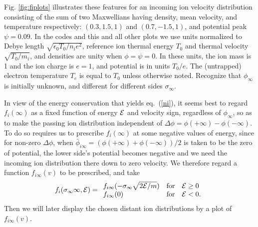 \documentclass[pre]{revtex4-2}
\def\energy{{\cal E}}
\begin{document}
Fig. \ref{fig:fiplots} illustrates these features for an incoming ion
velocity distribution consisting of the sum of two Maxwellians having density,
mean velocity, and temperature respectively: $(0.3,1.5,1)$ and
$(0.7,-1.5,1)$, and potential peak $\psi=0.09$. In the codes and
this and all other plots we use units normalized to Debye length
$\sqrt{\epsilon_0T_0/n_ie^2}$, reference ion thermal energy $T_0$ and
thermal velocity $\sqrt{T_0/m_i}$, and densities are unity when
$\phi=\psi=0$. In these units, the ion mass is 1 and the ion charge is
$e=1$, and potential is in units $T_0/e$. The (untrapped) electron temperature
$T_e$ is equal to $T_0$ unless otherwise noted. Recognize that $\phi_\infty$ is
initially unknown, and different for different sides $\sigma_\infty$.


In view of the energy conservation that yields eq.\ (\ref{ni}), it seems
best to regard $f_{i}(\infty)$ as a fixed function of energy $\energy$
and velocity sign, regardless of $\phi_\infty$, so as to
make the passing ion distribution independent of
$\Delta\phi=\phi(+\infty)-\phi(-\infty)$. To do
so requires us to prescribe $f_i(\infty)$ at some negative values of
energy, since for non-zero $\Delta\phi$, when
$\bar\phi_{i\infty}=(\phi(+\infty)+\phi(-\infty))/2$ is taken to be
the zero of potential, the lower side's potential becomes negative and
we need the incoming ion distribution there down to zero velocity. We
therefore regard a function $f_{i\infty}(v)$ to be prescribed, and take
\begin{equation} 
  \label{eq:fiinf}
  f_i(\sigma_\infty\infty,\energy)=
  \begin{array}{ll}f_{i\infty}(-\sigma_\infty\sqrt{2\energy/m})
  & \mbox{for}\quad \energy\ge 0\\
  f_{i\infty}(0) & \mbox{for}\quad \energy< 0.
  \end{array}
\end{equation}
Then we will later display the chosen distant ion distributions by a plot of
$f_{i\infty}(v)$.
\end{document}
